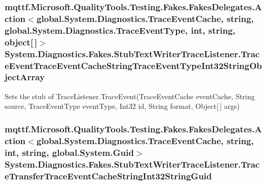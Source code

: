 \hypertarget{class_system_1_1_diagnostics_1_1_fakes_1_1_stub_text_writer_trace_listener_a2afdee410b1006babae79aa6e5f88423}{
\subsubsection[{Trace\-Event\-Trace\-Event\-Cache\-String\-Trace\-Event\-Type\-Int32\-String\-Object\-Array}]{\setlength{\rightskip}{0pt plus 5cm}mqttf.\-Microsoft.\-Quality\-Tools.\-Testing.\-Fakes.\-Fakes\-Delegates.\-Action$<$global.\-System.\-Diagnostics.\-Trace\-Event\-Cache, string, global.\-System.\-Diagnostics.\-Trace\-Event\-Type, int, string, object\mbox{[}$\,$\mbox{]}$>$ System.\-Diagnostics.\-Fakes.\-Stub\-Text\-Writer\-Trace\-Listener.\-Trace\-Event\-Trace\-Event\-Cache\-String\-Trace\-Event\-Type\-Int32\-String\-Object\-Array}}\label{class_system_1_1_diagnostics_1_1_fakes_1_1_stub_text_writer_trace_listener_a2afdee410b1006babae79aa6e5f88423}


Sets the stub of Trace\-Listener.\-Trace\-Event(\-Trace\-Event\-Cache event\-Cache, String source, Trace\-Event\-Type event\-Type, Int32 id, String format, Object\mbox{[}$\,$\mbox{]} args)

\hypertarget{class_system_1_1_diagnostics_1_1_fakes_1_1_stub_text_writer_trace_listener_a91ff7c481c8b8bc6d7b16ecbe0511d1b}{
\subsubsection[{Trace\-Transfer\-Trace\-Event\-Cache\-String\-Int32\-String\-Guid}]{\setlength{\rightskip}{0pt plus 5cm}mqttf.\-Microsoft.\-Quality\-Tools.\-Testing.\-Fakes.\-Fakes\-Delegates.\-Action$<$global.\-System.\-Diagnostics.\-Trace\-Event\-Cache, string, int, string, global.\-System.\-Guid$>$ System.\-Diagnostics.\-Fakes.\-Stub\-Text\-Writer\-Trace\-Listener.\-Trace\-Transfer\-Trace\-Event\-Cache\-String\-Int32\-String\-Guid}}\label{class_system_1_1_diagnostics_1_1_fakes_1_1_stub_text_writer_trace_listener_a91ff7c481c8b8bc6d7b16ecbe0511d1b}


